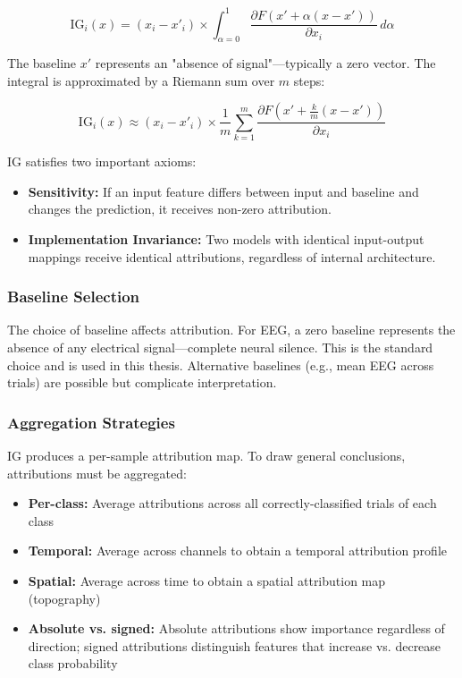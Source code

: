 \begin{equation}
    \text{IG}_i(x) = (x_i - x'_i) \times \int_{\alpha=0}^{1} \frac{\partial F(x' + \alpha(x - x'))}{\partial x_i} \, d\alpha
    \label{eq:ig}
\end{equation}

The baseline $x'$ represents an "absence of signal"—typically a zero vector. The integral is approximated by a Riemann sum over $m$ steps:

\begin{equation}
    \text{IG}_i(x) \approx (x_i - x'_i) \times \frac{1}{m} \sum_{k=1}^{m} \frac{\partial F(x' + \frac{k}{m}(x - x'))}{\partial x_i}
    \label{eq:ig_approx}
\end{equation}

IG satisfies two important axioms:

\begin{itemize}
    \item \textbf{Sensitivity:} If an input feature differs between input and baseline and changes the prediction, it receives non-zero attribution.
    \item \textbf{Implementation Invariance:} Two models with identical input-output mappings receive identical attributions, regardless of internal architecture.
\end{itemize}

\subsubsection{Baseline Selection}

The choice of baseline affects attribution. For EEG, a zero baseline represents the absence of any electrical signal—complete neural silence. This is the standard choice and is used in this thesis. Alternative baselines (e.g., mean EEG across trials) are possible but complicate interpretation.

\subsubsection{Aggregation Strategies}

IG produces a per-sample attribution map. To draw general conclusions, attributions must be aggregated:

\begin{itemize}
    \item \textbf{Per-class:} Average attributions across all correctly-classified trials of each class
    \item \textbf{Temporal:} Average across channels to obtain a temporal attribution profile
    \item \textbf{Spatial:} Average across time to obtain a spatial attribution map (topography)
    \item \textbf{Absolute vs. signed:} Absolute attributions show importance regardless of direction; signed attributions distinguish features that increase vs. decrease class probability
\end{itemize}


